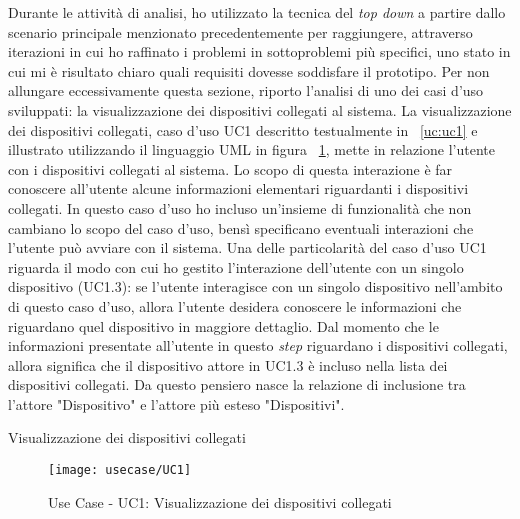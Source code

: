 Durante le attività di analisi, ho utilizzato la tecnica del \emph{top down} a partire dallo scenario principale menzionato precedentemente per raggiungere, attraverso iterazioni in cui ho raffinato i problemi in sottoproblemi più specifici, uno stato in cui mi è risultato chiaro quali requisiti dovesse soddisfare il prototipo.
Per non allungare eccessivamente questa sezione, riporto l'analisi di uno dei casi d'uso sviluppati: la visualizzazione dei dispositivi collegati al sistema.
La visualizzazione dei dispositivi collegati, caso d'uso UC1 descritto testualmente in ~\ref{uc:uc1} e illustrato utilizzando il linguaggio UML in figura ~\ref{fig:uc1}, mette in relazione l'utente con i dispositivi collegati al sistema. Lo scopo di questa interazione è far conoscere all'utente alcune informazioni elementari riguardanti i dispositivi collegati. In questo caso d'uso ho incluso un'insieme di funzionalità che non cambiano lo scopo del caso d'uso, bensì specificano eventuali interazioni che l'utente può avviare con il sistema. Una delle particolarità del caso d'uso UC1 riguarda il modo con cui ho gestito l'interazione dell'utente con un singolo dispositivo (UC1.3): se l'utente interagisce con un singolo dispositivo nell'ambito di questo caso d'uso, allora l'utente desidera conoscere le informazioni che riguardano quel dispositivo in maggiore dettaglio. Dal momento che le informazioni presentate all'utente in questo \emph{step} riguardano i dispositivi collegati, allora significa che il dispositivo attore in UC1.3 è incluso nella lista dei dispositivi collegati. Da questo pensiero nasce la relazione di inclusione tra l'attore "Dispositivo" e l'attore più esteso "Dispositivi".

\begin{usecase}{1}{Visualizzazione dei dispositivi collegati}
\label{uc:uc1}
\end{usecase}

\begin{figure}[!h]
    \centering
    \texttt{[image: usecase/UC1]}
    \caption{Use Case - UC1: Visualizzazione dei dispositivi collegati}
    \label{fig:uc1}
\end{figure}


